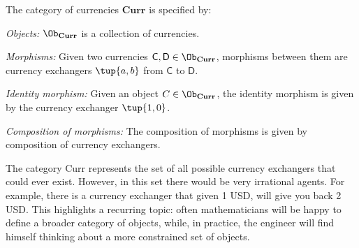 \begin{definition}
    The category of currencies $\mathbf{Curr}$ is specified by:
    \begin{compactenum}
        \item \emph{Objects:} $\Ob_\mathbf{Curr}$ is a collection of currencies.
        \item \emph{Morphisms:} Given two currencies $\mathsf{C},\mathsf{D}\in \Ob_{\mathbf{Curr}}$, morphisms between them are currency exchangers $\tup{a,b}$ from $\mathsf{C}$ to $\mathsf{D}$. 
        \item \emph{Identity morphism:} Given an object $C\in \Ob_\mathbf{Curr}$, the identity morphism is given by the currency exchanger $\tup{1,0}$.
        \item \emph{Composition of morphisms:} The composition of morphisms is given by composition of currency exchangers.
    \end{compactenum}
\end{definition}

The category Curr represents the set of all possible currency exchangers that could
ever exist. However, in this set there would be very irrational agents. For example, there is a currency exchanger that given 1 USD, will give you back 2 USD. This highlights a recurring topic: often mathematicians will be happy to define a broader category of objects, while, in practice, the engineer will find himself thinking about a more constrained set of objects.





